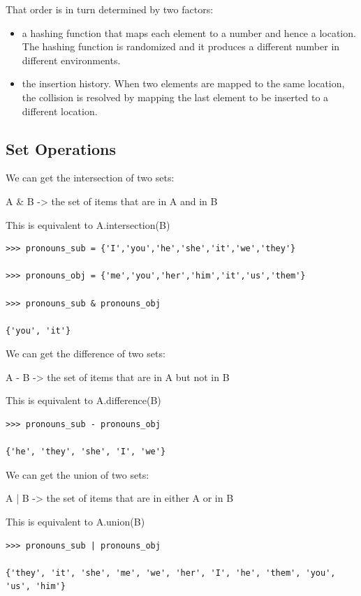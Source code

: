 \documentclass{article}
\begin{document}
That order is in turn determined by two factors:

\begin{itemize}
\item a hashing function that maps each element to a number and hence a location.  The hashing function is randomized and it produces a different number in different environments. 
\item the insertion history.  When two elements are mapped to the same location, the collision is resolved by mapping the last element to be inserted to a different location. 
\end{itemize}

\subsection{Set Operations}
We can get the intersection of two sets:

A \& B -> the set of items that are in A and in B

This is equivalent to A.intersection(B)

\begin{lstlisting}
>>> pronouns_sub = {'I','you','he','she','it','we','they'}

>>> pronouns_obj = {'me','you','her','him','it','us','them'}

>>> pronouns_sub & pronouns_obj

{'you', 'it'}

\end{lstlisting}


We can get the difference of two sets:

A - B -> the set of items that are in A but not in B

This is equivalent to A.difference(B)

\begin{lstlisting}
>>> pronouns_sub - pronouns_obj

{'he', 'they', 'she', 'I', 'we'}

\end{lstlisting}

We can get the union of two sets:

A | B -> the set of items that are in either A or in B

This is equivalent to A.union(B)

\begin{lstlisting}
>>> pronouns_sub | pronouns_obj

{'they', 'it', 'she', 'me', 'we', 'her', 'I', 'he', 'them', 'you', 'us', 'him'}

\end{lstlisting} 
\end{document}
